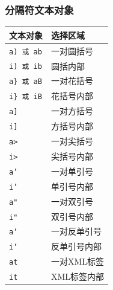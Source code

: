 \subsubsection{分隔符文本对象}
\begin{longtable}{ll}\hline\hline

	\textbf{文本对象} & \textbf{选择区域}\\

    \endhead

	\texttt{a) 或 ab}  & 一对圆括号 \\

	\texttt{i) 或 ib} & 圆括内部 \\
	
	\texttt{a\} 或 aB} & 一对花括号 \\

	\texttt{i\} 或 iB} & 花括号内部 \\

	\texttt{a]} & 一对方括号 \\

	\texttt{i]} & 方括号内部 \\

	\texttt{a>} & 一对尖括号 \\

	\texttt{i>} & 尖括号内部 \\

	\texttt{a'} & 一对单引号 \\

	\texttt{i'} & 单引号内部 \\

	\texttt{a"} & 一对双引号 \\

	\texttt{i"} & 双引号内部 \\
	
	\texttt{a`} & 一对反单引号 \\

	\texttt{i`} & 反单引号内部 \\

	\texttt{at} & 一对XML标签 \\

	\texttt{it} & XML标签内部 \\
    \hline
\end{longtable} 

